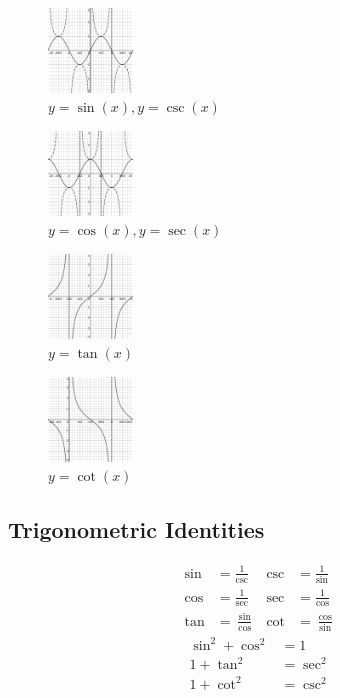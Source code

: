 \documentclass[twocolumn]{article}
\begin{document}
	\begin{figure}[H]
		\centering
		\includegraphics[width=0.20\textwidth]{sin-csc.png}
		\caption{$ y = \sin(x), y = \csc(x) $}
	\end{figure}

	\begin{figure}[H]
		\centering
		\includegraphics[width=0.20\textwidth]{cos-sec.png}
		\caption{$ y = \cos(x), y= \sec(x) $}
	\end{figure}

	\begin{figure}[H]
		\centering
		\includegraphics[width=0.20\textwidth]{tan.png}
		\caption{$ y = \tan(x) $}
	\end{figure}

	\begin{figure}[H]
		\centering
		\includegraphics[width=0.20\textwidth]{cot.png}
		\caption{$ y = \cot(x) $}
	\end{figure}

	\subsection*{Trigonometric Identities}
	
	\begin{align*}
		\sin &= \frac{1}{\csc}  & \csc & = \frac{1}{\sin} \\
		\cos &= \frac{1}{\sec} & \sec & = \frac{1}{\cos} \\
		\tan &= \frac{\sin}{\cos}  & \cot & = \frac{\cos}{\sin}
	\end{align*}
	\vspace{0pt}
	\begin{align*}
		\sin^2 + \cos^2 &= 1 \\
		1 + \tan^2 &= \sec^2 \\
		1 + \cot^2 &= \csc^2
	\end{align*}
	\vspace{-2.2em}
\end{document}
